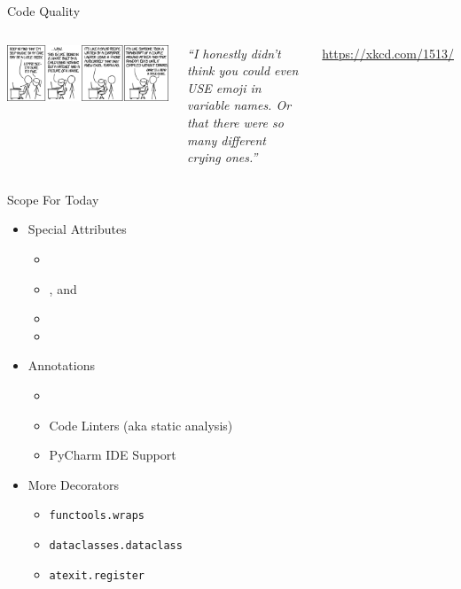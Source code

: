 
\begin{frame}[t,plain]
\titlepage
\end{frame}


\begin{frame}{Code Quality}
%
\begin{columns}
\begin{center}
\includegraphics[width=\linewidth]{./gfx/07-xkcd-codeQuality}\\
\end{center}
%
\small
	\emph{\enquote{I honestly didn't think you could even USE emoji in variable names. Or that there were so many different crying ones.}}

	\vspace{6pt}
	\url{https://xkcd.com/1513/}
\end{columns}
%
\end{frame}


\begin{frame}{Scope For Today}
%
\begin{itemize}
\item Special Attributes
	\begin{itemize}
	\item {}
	\item {},  and 
	\item {}
	\item {}
	\end{itemize}
\item Annotations
	\begin{itemize}
	\item {}
	\item Code Linters (aka static analysis)
	\item PyCharm IDE Support
	\end{itemize}
\item More Decorators
	\begin{itemize}
	\item \texttt{functools.wraps}
	\item \texttt{dataclasses.dataclass}
	\item \texttt{atexit.register}
	\end{itemize}
\end{itemize}
%
\end{frame}

